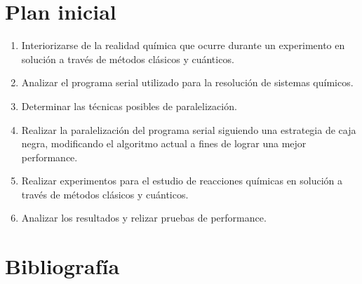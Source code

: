 \documentclass[a4paper, 12pt]{article}
\begin{document}
\section*{Plan inicial}

\begin{enumerate}
\item Interiorizarse de la realidad qu\'imica que ocurre durante un experimento en soluci\'on a trav\'es de m\'etodos cl\'asicos y cu\'anticos.

\item Analizar el programa serial utilizado para la resoluci\'on de sistemas qu\'imicos.

\item Determinar las t\'ecnicas posibles de paralelizaci\'on.

\item Realizar la paralelizaci\'on del programa serial siguiendo una estrategia de caja negra, modificando el algoritmo actual a fines de lograr una mejor performance.

\item Realizar experimentos para el estudio de reacciones qu\'imicas en soluci\'on a trav\'es de m\'etodos cl\'asicos y cu\'anticos.

\item Analizar los resultados y relizar pruebas de performance.

\end{enumerate}

\section*{Bibliograf\'ia}
\end{document}
